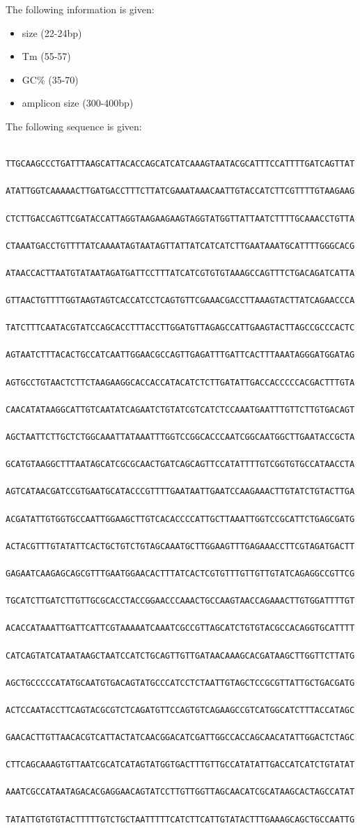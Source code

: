 The following information is given:

\begin{highlight}
    \begin{itemize}
        \item size (22-24bp)
        \item Tm (55-57)
        \item GC\% (35-70)
        \item amplicon size (300-400bp)
    \end{itemize}
\end{highlight}

The following sequence is given:

\begin{verbatim}
    TTGCAAGCCCTGATTTAAGCATTACACCAGCATCATCAAAGTAATACGCATTTCCATTTTGATCAGTTAT
    ATATTGGTCAAAAACTTGATGACCTTTCTTATCGAAATAAACAATTGTACCATCTTCGTTTTGTAAGAAG
    CTCTTGACCAGTTCGATACCATTAGGTAAGAAGAAGTAGGTATGGTTATTAATCTTTTGCAAACCTGTTA
    CTAAATGACCTGTTTTATCAAAATAGTAATAGTTATTATCATCATCTTGAATAAATGCATTTTGGGCACG
    ATAACCACTTAATGTATAATAGATGATTCCTTTATCATCGTGTGTAAAGCCAGTTTCTGACAGATCATTA
    GTTAACTGTTTTGGTAAGTAGTCACCATCCTCAGTGTTCGAAACGACCTTAAAGTACTTATCAGAACCCA
    TATCTTTCAATACGTATCCAGCACCTTTACCTTGGATGTTAGAGCCATTGAAGTACTTAGCCGCCCACTC
    AGTAATCTTTACACTGCCATCAATTGGAACGCCAGTTGAGATTTGATTCACTTTAAATAGGGATGGATAG
    AGTGCCTGTAACTCTTCTAAGAAGGCACCACCATACATCTCTTGATATTGACCACCCCCACGACTTTGTA
    CAACATATAAGGCATTGTCAATATCAGAATCTGTATCGTCATCTCCAAATGAATTTGTTCTTGTGACAGT
    AGCTAATTCTTGCTCTGGCAAATTATAAATTTGGTCCGGCACCCAATCGGCAATGGCTTGAATACCGCTA
    GCATGTAAGGCTTTAATAGCATCGCGCAACTGATCAGCAGTTCCATATTTTGTCGGTGTGCCATAACCTA
    AGTCATAACGATCCGTGAATGCATACCCGTTTTGAATAATTGAATCCAAGAAACTTGTATCTGTACTTGA
    ACGATATTGTGGTGCCAATTGGAAGCTTGTCACACCCCATTGCTTAAATTGGTCCGCATTCTGAGCGATG
    ACTACGTTTGTATATTCACTGCTGTCTGTAGCAAATGCTTGGAAGTTTGAGAAACCTTCGTAGATGACTT
    GAGAATCAAGAGCAGCGTTTGAATGGAACACTTTATCACTCGTGTTTGTTGTTGTATCAGAGGCCGTTCG
    TGCATCTTGATCTTGTTGCGCACCTACCGGAACCCAAACTGCCAAGTAACCAGAAACTTGTGGATTTTGT
    ACACCATAAATTGATTCATTCGTAAAAATCAAATCGCCGTTAGCATCTGTGTACGCCACAGGTGCATTTT
    CATCAGTATCATAATAAGCTAATCCATCTGCAGTTGTTGATAACAAAGCACGATAAGCTTGGTTCTTATG
    AGCTGCCCCCATATGCAATGTGACAGTATGCCCATCCTCTAATTGTAGCTCCGCGTTATTGCTGACGATG
    ACTCCAATACCTTCAGTACGCGTCTCAGATGTTCCAGTGTCAGAAGCCGTCATGGCATCTTTACCATAGC
    GAACACTTGTTAACACGTCATTACTATCAACGGACATCGATTGGCCACCAGCAACATATTGGACTCTAGC
    CTTCAGCAAAGTGTTAATCGCATCATAGTATGGTGACTTTGTTGCCATATATTGACCATCATCTGTATAT
    AAATCGCCATAATAGACACGAGGAACAGTATCCTTGTTGGTTAGCAACATCGCATAAGCACTAGCCATAT
    TATATTGTGTGTACTTTTTGTCTGCTAATTTTTCATCTTCATTGTATACTTTGAAAGCAGCTGCCAATTG
\end{verbatim}


